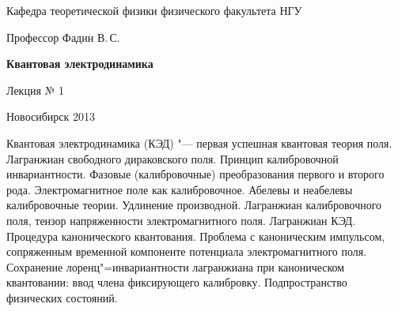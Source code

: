 \documentclass[12pt,pagesize,paper=landscape,paper=192mm:108mm]{scrbook}
\begin{document}
\begin{titlepage}
\begin{center}
    Кафедра теоретической физики физического факультета НГУ
    \medskip

    \Large
    Профессор Фадин В.\,С.
    \bigskip

    \huge
    \textbf{Квантовая электродинамика}
    \bigskip

    \Large
    Лекция № 1
    \vfill

    \normalsize
    \vfill

    \normalsize \ccbysa\hspace{0.5em}  Новосибирск 2013
  \end{center}
\end{titlepage}
\newpage

\vspace*{-1em}
\begin{center}
\vfill
  \begin{minipage}{0.65\linewidth}
    Квантовая электродинамика (КЭД) "--- первая успешная квантовая
    теория поля. Лагранжиан свободного дираковского поля. Принцип
    калибровочной инвариантности. Фазовые (калибровочные)
    преобразования первого и второго рода. Электромагнитное поле как
    калибровочное. Абелевы и неабелевы калибровочные теории. Удлинение
    производной.  Лагранжиан калибровочного поля, тензор напряженности
    электромагнитного поля.  Лагранжиан КЭД. Процедура канонического
    квантования. Проблема с каноническим импульсом, сопряженным
    временной компоненте потенциала электромагнитного поля.
    Сохранение лоренц"=инвариантности лагранжиана при каноническом
    квантовании: ввод члена фиксирующего калибровку. Подпространство
    физических состояний.
  \end{minipage}
  \vfill

\end{center}
\end{document}
